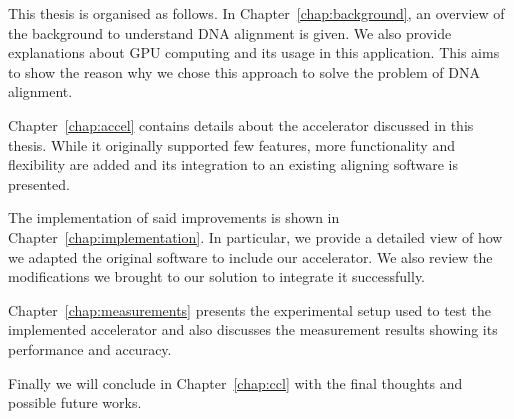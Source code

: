 This thesis is organised as follows.
In Chapter~\ref{chap:background}, an overview of the background to understand DNA alignment is given. We also provide explanations about GPU computing and its usage in this application. This aims to show the reason why we chose this approach to solve the problem of DNA alignment.

Chapter~\ref{chap:accel} contains details about the accelerator discussed in this thesis. While it originally supported few features, more functionality and flexibility are added and its integration to an existing aligning software is presented.

The implementation of said improvements is shown in Chapter~\ref{chap:implementation}. In particular, we provide a detailed view of how we adapted the original software to include our accelerator. We also review the modifications we brought to our solution to integrate it successfully.

Chapter~\ref{chap:measurements} presents the experimental setup used to test the implemented accelerator and also discusses the measurement results showing its performance and accuracy.

Finally we will conclude in Chapter~\ref{chap:ccl} with the final thoughts and possible future works.
